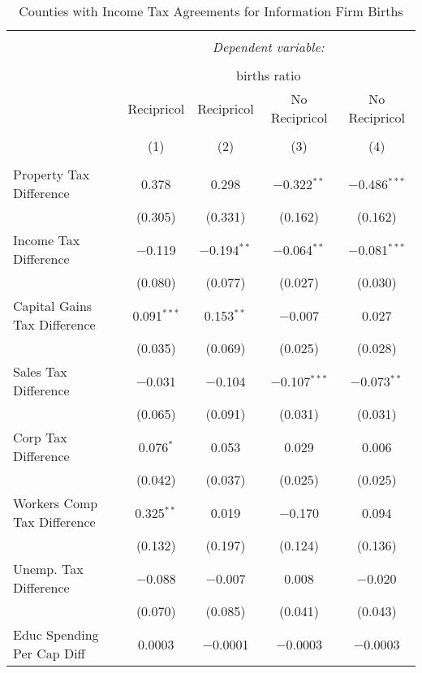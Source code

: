 
\begin{table}[!htbp] \centering 
  \caption{Counties with Income Tax Agreements for  Information Firm Births} 
  \label{51agreement} 
\begin{tabular}{@{\extracolsep{5pt}}lcccc} 
\\[-1.8ex]\hline 
\hline \\[-1.8ex] 
 & \multicolumn{4}{c}{\textit{Dependent variable:}} \\ 
\cline{2-5} 
\\[-1.8ex] & \multicolumn{4}{c}{births ratio} \\ 
 & Recipricol & Recipricol & No Recipricol & No Recipricol \\ 
\\[-1.8ex] & (1) & (2) & (3) & (4)\\ 
\hline \\[-1.8ex] 
 Property Tax Difference & 0.378 & 0.298 & $-$0.322$^{**}$ & $-$0.486$^{***}$ \\ 
  & (0.305) & (0.331) & (0.162) & (0.162) \\ 
  Income Tax Difference & $-$0.119 & $-$0.194$^{**}$ & $-$0.064$^{**}$ & $-$0.081$^{***}$ \\ 
  & (0.080) & (0.077) & (0.027) & (0.030) \\ 
  Capital Gains Tax Difference & 0.091$^{***}$ & 0.153$^{**}$ & $-$0.007 & 0.027 \\ 
  & (0.035) & (0.069) & (0.025) & (0.028) \\ 
  Sales Tax Difference & $-$0.031 & $-$0.104 & $-$0.107$^{***}$ & $-$0.073$^{**}$ \\ 
  & (0.065) & (0.091) & (0.031) & (0.031) \\ 
  Corp Tax Difference & 0.076$^{*}$ & 0.053 & 0.029 & 0.006 \\ 
  & (0.042) & (0.037) & (0.025) & (0.025) \\ 
  Workers Comp Tax Difference & 0.325$^{**}$ & 0.019 & $-$0.170 & 0.094 \\ 
  & (0.132) & (0.197) & (0.124) & (0.136) \\ 
  Unemp. Tax Difference & $-$0.088 & $-$0.007 & 0.008 & $-$0.020 \\ 
  & (0.070) & (0.085) & (0.041) & (0.043) \\ 
  Educ Spending Per Cap Diff & 0.0003 & $-$0.0001 & $-$0.0003 & $-$0.0003 \\ 

\end{tabular}
\end{table}
